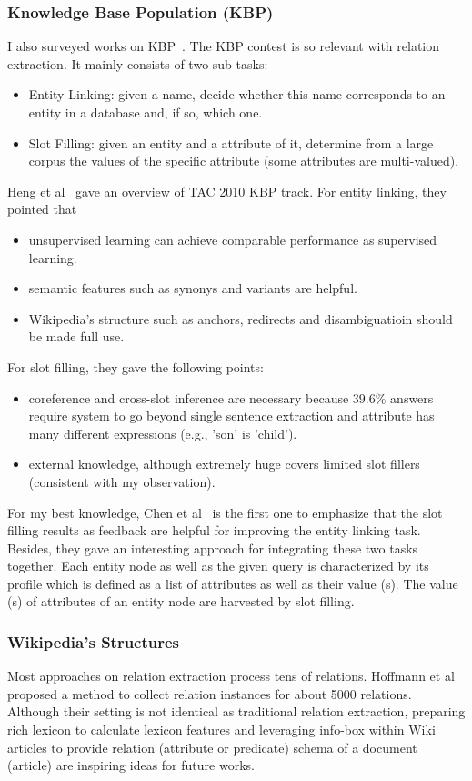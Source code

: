 \documentclass[10pt]{article} %
\theoremstyle{definition}
\theoremstyle{definition}
\begin{document}
\subsubsection{Knowledge Base Population (KBP)}
I also surveyed works on KBP~\cite{overviewkbp10, kbp12nyu, cunykbp10}. 
The KBP contest is so relevant with relation extraction. 
It mainly consists of two sub-tasks:
\begin{itemize}
\item Entity Linking: given a name, decide whether this name corresponds to an entity in a database and, if so, which one. 
\item Slot Filling: given an entity and a attribute of it, determine from a large corpus the values of the specific attribute (some attributes are multi-valued). 
\end{itemize}
Heng et al~\cite{overviewkbp10} gave an overview of TAC 2010 KBP track. 
For entity linking, they pointed that 
\begin{itemize}
\item unsupervised learning can achieve comparable performance as supervised learning. 
\item semantic features such as synonys and variants are helpful. 
\item Wikipedia's structure such as anchors, redirects and disambiguatioin should be made full use. 
\end{itemize}
For slot filling, they gave the following points:
\begin{itemize}
\item coreference and cross-slot inference are necessary because $39.6\%$ answers require system to go beyond single sentence extraction and attribute has many different expressions (e.g., 'son' is 'child'). 
\item external knowledge, although extremely huge covers limited slot fillers (consistent with my observation). 
\end{itemize}
For my best knowledge, Chen et al~\cite{cunykbp10} is the first one to emphasize that 
the slot filling results as feedback are helpful for improving the entity linking task. 
Besides, they gave an interesting approach for integrating these two tasks together. 
Each entity node as well as the given query is characterized by its profile which is defined as 
a list of attributes as well as their value (s).
The value (s) of attributes of an entity node are harvested by slot filling. 



\subsubsection{Wikipedia's Structures}
Most approaches on relation extraction process tens of relations. 
Hoffmann et al~\cite{learn5000} proposed a method to collect relation instances for about 5000 relations. 
Although their setting is not identical as traditional relation extraction, preparing rich lexicon to calculate lexicon features and 
leveraging info-box within Wiki articles to provide relation (attribute or predicate) schema of a document (article) are inspiring ideas for future works. 
\end{document}

